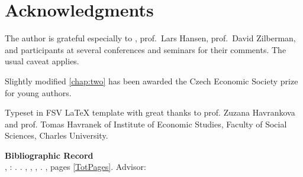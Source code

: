 \section*{Acknowledgments}
The author is grateful especially to \Supervisor, prof.\ Lars Hansen, prof.\ David Zilberman, and participants at several conferences and seminars for their comments. The usual caveat applies.

Slightly modified \autoref{chap:two} has been awarded the Czech Economic Society prize for young authors.



\vfill

\noindent Typeset in FSV \LaTeX \hspace{0cm} template with great thanks to prof. Zuzana Havrankova and prof. Tomas Havranek of Institute of Economic Studies, Faculty of Social Sciences, Charles University. 

\bigskip

\noindent \textbf{Bibliographic Record} \\
\LastNameDP, \FirstNameDP: \emph{\Bookname}. \BookName. \CUNI, \FSS, \IES, \Place. \Year, pages \ref*{TotPages}. Advisor: \Supervisor


